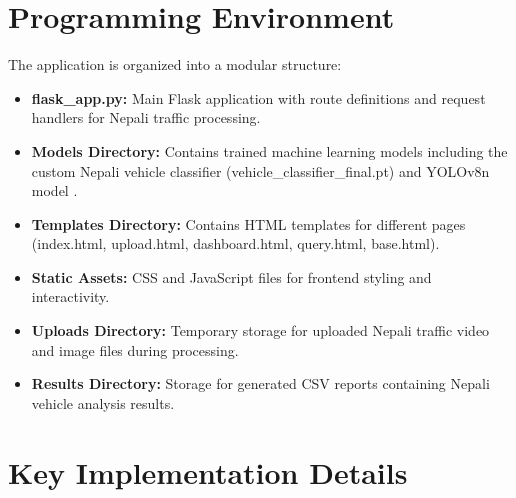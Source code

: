 \documentclass[12pt,a4paper]{report}
\begin{document}
\section{Programming Environment}
The application is organized into a modular structure:

\begin{itemize}
    \item \textbf{flask\_app.py:} Main Flask application with route definitions and request handlers for Nepali traffic processing.
    \item \textbf{Models Directory:} Contains trained machine learning models including the custom Nepali vehicle classifier (vehicle\_classifier\_final.pt) and YOLOv8n model \cite{ultralytics2023yolov8}.
    \item \textbf{Templates Directory:} Contains HTML templates for different pages (index.html, upload.html, dashboard.html, query.html, base.html).
    \item \textbf{Static Assets:} CSS and JavaScript files for frontend styling and interactivity.
    \item \textbf{Uploads Directory:} Temporary storage for uploaded Nepali traffic video and image files during processing.
    \item \textbf{Results Directory:} Storage for generated CSV reports containing Nepali vehicle analysis results.
\end{itemize}

\section{Key Implementation Details}
\end{document}
